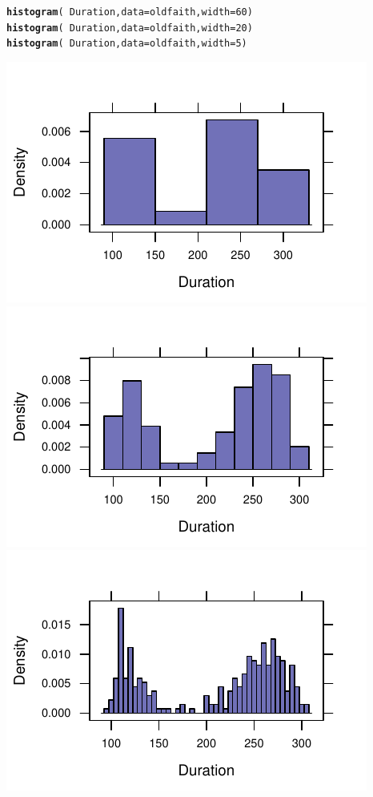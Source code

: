 \documentclass[twoside]{book}\usepackage[]{graphicx}\usepackage[]{xcolor}
\makeatletter
\newcommand{\hlnum}[1]{\textcolor[rgb]{0.686,0.059,0.569}{#1}}%
\newcommand{\hlopt}[1]{\textcolor[rgb]{0,0,0}{#1}}%
\newcommand{\hlstd}[1]{\textcolor[rgb]{0.345,0.345,0.345}{#1}}%
\newcommand{\hlkwc}[1]{\textcolor[rgb]{0.333,0.667,0.333}{#1}}%
\newcommand{\hlkwd}[1]{\textcolor[rgb]{0.737,0.353,0.396}{\textbf{#1}}}%
\newenvironment{kframe}{%
 \def\at@end@of@kframe{}%
 \ifinner\ifhmode%
  \def\at@end@of@kframe{\end{minipage}}%
  \begin{minipage}{\columnwidth}%
 \fi\fi%
 \def\FrameCommand##1{\hskip\@totalleftmargin \hskip-\fboxsep
 \colorbox{shadecolor}{##1}\hskip-\fboxsep
     \hskip-\linewidth \hskip-\@totalleftmargin \hskip\columnwidth}%
 \MakeFramed {\advance\hsize-\width
   \@totalleftmargin\z@ \linewidth\hsize
   \@setminipage}}%
 {\par\unskip\endMakeFramed%
 \at@end@of@kframe}
\newenvironment{knitrout}{}{} %
\makeatother
\begin{document}
\begin{knitrout}
\color{fgcolor}\begin{kframe}
\begin{alltt}
\hlkwd{histogram}\hlstd{(}\hlopt{~}\hlstd{Duration,} \hlkwc{data} \hlstd{= oldfaith,} \hlkwc{width} \hlstd{=} \hlnum{60}\hlstd{)}
\hlkwd{histogram}\hlstd{(}\hlopt{~}\hlstd{Duration,} \hlkwc{data} \hlstd{= oldfaith,} \hlkwc{width} \hlstd{=} \hlnum{20}\hlstd{)}
\hlkwd{histogram}\hlstd{(}\hlopt{~}\hlstd{Duration,} \hlkwc{data} \hlstd{= oldfaith,} \hlkwc{width} \hlstd{=} \hlnum{5}\hlstd{)}
\end{alltt}
\end{kframe}

{\centering \includegraphics[width=.3\textwidth]{figures/fig-xhistogram-1} 
\includegraphics[width=.3\textwidth]{figures/fig-xhistogram-2} 
\includegraphics[width=.3\textwidth]{figures/fig-xhistogram-3} 

}



\end{knitrout}
\end{document}
